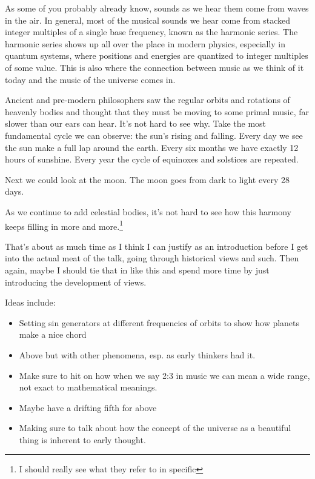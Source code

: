 \documentclass[12pt]{article}[titlepage]
\newcommand{\1}{\={a}}
\newcommand{\2}{\={e}}
\newcommand{\3}{\={\i}}
\newcommand{\4}{\=o}
\newcommand{\5}{\=u}
\newcommand{\6}{\={A}}
\renewcommand{\,}{\textsuperscript{,}}
\begin{document}
As some of you probably already know, sounds as we hear them come from waves in the air.
In general, most of the musical sounds we hear come from stacked integer multiples of a single base frequency, known as the harmonic series.
The harmonic series shows up all over the place in modern physics, especially in quantum systems, where positions and energies are quantized to integer multiples of some value.
This is also where the connection between music as we think of it today and the music of the universe comes in.

Ancient and pre-modern philosophers saw the regular orbits and rotations of heavenly bodies and thought that they must be moving to some primal music, far slower than our ears can hear.
It's not hard to see why.
Take the most fundamental cycle we can observe: the sun's rising and falling.
Every day we see the sun make a full lap around the earth.
Every six months we have exactly 12 hours of sunshine.
Every year the cycle of equinoxes and solstices are repeated.

Next we could look at the moon.
The moon goes from dark to light every 28 days.

As we continue to add celestial bodies, it's not hard to see how this harmony keeps filling in more and more.\footnote{I should really see what they refer to in specific}

That's about as much time as I think I can justify as an introduction before I get into the actual meat of the talk, going through historical views and such.
Then again, maybe I should tie that in like this and spend more time by just introducing the development of views.

Ideas include:
\begin{itemize}
\item Setting sin generators at different frequencies of orbits to show how planets make a nice chord
\item Above but with other phenomena, esp. as early thinkers had it.
\item Make sure to hit on how when we say 2:3 in music we can mean a wide range, not exact to mathematical meanings.
\item Maybe have a drifting fifth for above
\item Making sure to talk about how the concept of the universe as a beautiful thing is inherent to early thought.
\end{itemize}
\end{document}
